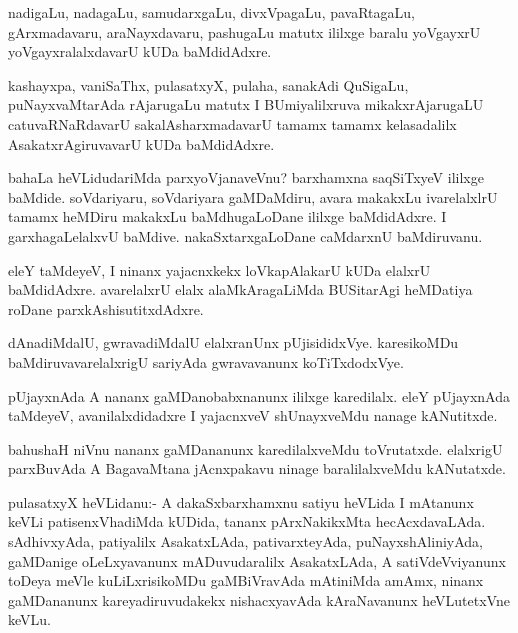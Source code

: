 \documentclass{article}
\begin{document}
\begin{mn}
nadigaLu, nadagaLu, samudarxgaLu, divxVpagaLu, pavaRtagaLu,
gArxmadavaru, araNayxdavaru, pashugaLu matutx ililxge baralu yoVgayxrU
yoVgayxralalxdavarU kUDa baMdidAdxre.
\end{mn}

\begin{mn}%
kashayxpa, vaniSaThx, pulasatxyX, pulaha, sanakAdi QuSigaLu,
puNayxvaMtarAda rAjarugaLu matutx I BUmiyalilxruva mikakxrAjarugaLU
catuvaRNaRdavarU sakalAsharxmadavarU tamamx tamamx kelasadalilx
AsakatxrAgiruvavarU kUDa baMdidAdxre.
\end{mn}

\begin{mn}%
bahaLa heVLidudariMda parxyoVjanaveVnu? barxhamxna saqSiTxyeV ililxge
baMdide. soVdariyaru, soVdariyara gaMDaMdiru, avara makakxLu
ivarelalxlrU tamamx heMDiru makakxLu baMdhugaLoDane ililxge
baMdidAdxre. I garxhagaLelalxvU baMdive. nakaSxtarxgaLoDane caMdarxnU baMdiruvanu.
\end{mn}

\begin{mn}
eleY taMdeyeV, I ninanx yajacnxkekx loVkapAlakarU kUDa elalxrU
baMdidAdxre. avarelalxrU elalx alaMkAragaLiMda BUSitarAgi heMDatiya
roDane parxkAshisutitxdAdxre.
\end{mn}

\begin{mn}
dAnadiMdalU, gwravadiMdalU elalxranUnx pUjisididxVye. karesikoMDu
baMdiruvavarelalxrigU sariyAda gwravavanunx koTiTxdodxVye.
\end{mn}

\begin{mn}
pUjayxnAda A nananx gaMDanobabxnanunx ililxge karedilalx. eleY
pUjayxnAda taMdeyeV, avanilalxdidadxre I yajacnxveV shUnayxveMdu
nanage kANutitxde.
\end{mn}

\begin{mn}%
bahushaH niVnu nananx gaMDananunx karedilalxveMdu
toVrutatxde. elalxrigU parxBuvAda A BagavaMtana jAcnxpakavu ninage
baralilalxveMdu kANutatxde.
\end{mn}

\begin{mn}%
pulasatxyX heVLidanu:- A dakaSxbarxhamxnu satiyu heVLida I mAtanunx
keVLi patisenxVhadiMda kUDida, tananx pArxNakikxMta
hecAcxdavaLAda. sAdhivxyAda, patiyalilx AsakatxLAda, pativarxteyAda,
puNayxshAliniyAda, gaMDanige oLeLxyavanunx mADuvudaralilx AsakatxLAda,
A satiVdeVviyanunx toDeya meVle kuLiLxrisikoMDu gaMBiVravAda mAtiniMda
amAmx, ninanx gaMDananunx kareyadiruvudakekx nishacxyavAda
kAraNavanunx heVLutetxVne keVLu.
\end{mn}
\end{document}

